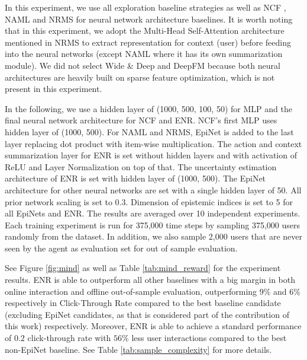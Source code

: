  In this experiment, we use all exploration baseline strategies as well as NCF \cite{he2017neural}, NAML \cite{wu2019naml} and NRMS \cite{wu2019neural} for neural network architecture baselines. It is worth noting that in this experiment, we adopt the Multi-Head Self-Attention architecture mentioned in NRMS \cite{wu2019neural} to extract representation for context (user) before feeding into the neural networks (except NAML where it has its own summarization module). We did not select Wide \& Deep and DeepFM because both neural architectures are heavily built on sparse feature optimization, which is not present in this experiment.

In the following, we use a hidden layer of (1000, 500, 100, 50) for MLP and the final neural network architecture for NCF and ENR. NCF's first MLP uses hidden layer of (1000, 500). For NAML and NRMS, EpiNet is added to the last layer replacing dot product with item-wise multiplication. The action and context summarization layer for ENR is set without hidden layers and with activation of ReLU and Layer Normalization on top of that. The uncertainty estimation architecture of ENR is set with hidden layer of (1000, 500). The EpiNet architecture for other neural networks are set with a single hidden layer of 50. All prior network scaling is set to 0.3. Dimension of epistemic indices is set to 5 for all EpiNets and ENR. The results are averaged over 10 independent experiments. Each training experiment is run for 375,000 time steps by sampling 375,000 users randomly from the dataset. In addition, we also sample 2,000 users that are never seen by the agent as evaluation set for out of sample evaluation.

See Figure \ref{fig:mind} as well as Table \ref{tab:mind_reward} for the experiment results. ENR is able to outperform all other baselines with a big margin in both online interaction and offline out-of-sample evaluation, outperforming $9\%$ and $6\%$ respectively in Click-Through Rate compared to the best baseline candidate (excluding EpiNet candidates, as that is considered part of the contribution of this work) respectively. Moreover, ENR is able to achieve a standard performance of $0.2$ click-through rate with $56\%$ less user interactions compared to the best non-EpiNet baseline. See Table \ref{tab:sample_complexity} for more details.

